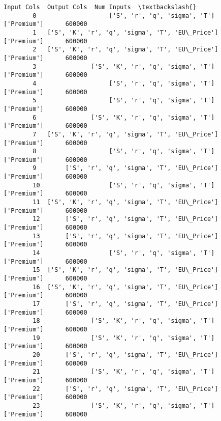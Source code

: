 \documentclass[11pt]{article}
\begin{document}
\begin{Verbatim}[commandchars=\\\{\}]
                                                Input Cols  Output Cols  Num Inputs  \textbackslash{}
        0                    ['S', 'r', 'q', 'sigma', 'T']  ['Premium']      600000   
        1   ['S', 'K', 'r', 'q', 'sigma', 'T', 'EU\_Price']  ['Premium']      600000   
        2   ['S', 'K', 'r', 'q', 'sigma', 'T', 'EU\_Price']  ['Premium']      600000   
        3               ['S', 'K', 'r', 'q', 'sigma', 'T']  ['Premium']      600000   
        4                    ['S', 'r', 'q', 'sigma', 'T']  ['Premium']      600000   
        5                    ['S', 'r', 'q', 'sigma', 'T']  ['Premium']      600000   
        6               ['S', 'K', 'r', 'q', 'sigma', 'T']  ['Premium']      600000   
        7   ['S', 'K', 'r', 'q', 'sigma', 'T', 'EU\_Price']  ['Premium']      600000   
        8                    ['S', 'r', 'q', 'sigma', 'T']  ['Premium']      600000   
        9        ['S', 'r', 'q', 'sigma', 'T', 'EU\_Price']  ['Premium']      600000   
        10                   ['S', 'r', 'q', 'sigma', 'T']  ['Premium']      600000   
        11  ['S', 'K', 'r', 'q', 'sigma', 'T', 'EU\_Price']  ['Premium']      600000   
        12       ['S', 'r', 'q', 'sigma', 'T', 'EU\_Price']  ['Premium']      600000   
        13       ['S', 'r', 'q', 'sigma', 'T', 'EU\_Price']  ['Premium']      600000   
        14                   ['S', 'r', 'q', 'sigma', 'T']  ['Premium']      600000   
        15  ['S', 'K', 'r', 'q', 'sigma', 'T', 'EU\_Price']  ['Premium']      600000   
        16  ['S', 'K', 'r', 'q', 'sigma', 'T', 'EU\_Price']  ['Premium']      600000   
        17       ['S', 'r', 'q', 'sigma', 'T', 'EU\_Price']  ['Premium']      600000   
        18              ['S', 'K', 'r', 'q', 'sigma', 'T']  ['Premium']      600000   
        19              ['S', 'K', 'r', 'q', 'sigma', 'T']  ['Premium']      600000   
        20       ['S', 'r', 'q', 'sigma', 'T', 'EU\_Price']  ['Premium']      600000   
        21              ['S', 'K', 'r', 'q', 'sigma', 'T']  ['Premium']      600000   
        22       ['S', 'r', 'q', 'sigma', 'T', 'EU\_Price']  ['Premium']      600000   
        23              ['S', 'K', 'r', 'q', 'sigma', 'T']  ['Premium']      600000   
        

\end{Verbatim}
\end{document}
